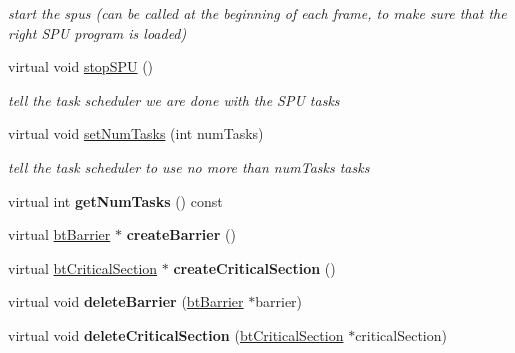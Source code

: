 \begin{DoxyCompactItemize}
\begin{DoxyCompactList}\small\item\em start the spus (can be called at the beginning of each frame, to make sure that the right S\+PU program is loaded) \end{DoxyCompactList}\item 
\mbox{\label{classSequentialThreadSupport_a251cff154387318b0779292a21e85c3a}} 
virtual void \hyperlink{classSequentialThreadSupport_a251cff154387318b0779292a21e85c3a}{stop\+S\+PU} ()
\begin{DoxyCompactList}\small\item\em tell the task scheduler we are done with the S\+PU tasks \end{DoxyCompactList}\item 
\mbox{\label{classSequentialThreadSupport_ad767dba103e89a0df1495c928dba7cc2}} 
virtual void \hyperlink{classSequentialThreadSupport_ad767dba103e89a0df1495c928dba7cc2}{set\+Num\+Tasks} (int num\+Tasks)
\begin{DoxyCompactList}\small\item\em tell the task scheduler to use no more than num\+Tasks tasks \end{DoxyCompactList}\item 
\mbox{\label{classSequentialThreadSupport_ac70d8efb2ae2a63382e221d2a102fdc4}} 
virtual int {\bfseries get\+Num\+Tasks} () const
\item 
\mbox{\label{classSequentialThreadSupport_adc1ec843301cc244abcadc07196d49de}} 
virtual \hyperlink{classbtBarrier}{bt\+Barrier} $\ast$ {\bfseries create\+Barrier} ()
\item 
\mbox{\label{classSequentialThreadSupport_aa4aa306d9cb3f6f26e6616056fe04032}} 
virtual \hyperlink{classbtCriticalSection}{bt\+Critical\+Section} $\ast$ {\bfseries create\+Critical\+Section} ()
\item 
\mbox{\label{classSequentialThreadSupport_a3034f1ab4c9e16fc586ebab0696e1e13}} 
virtual void {\bfseries delete\+Barrier} (\hyperlink{classbtBarrier}{bt\+Barrier} $\ast$barrier)
\item 
\mbox{\label{classSequentialThreadSupport_a33538d318a3d4dc3b3d367978db4feb1}} 
virtual void {\bfseries delete\+Critical\+Section} (\hyperlink{classbtCriticalSection}{bt\+Critical\+Section} $\ast$critical\+Section)
\end{DoxyCompactItemize}


